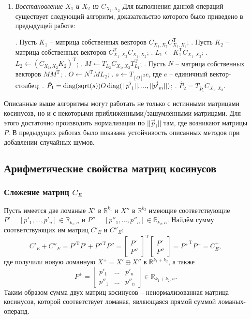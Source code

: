 \begin{enumerate}
\item \textit{Восстановление $X_1$ и $X_2$ из $C_{X_1, X_2}$}
Для выполнения данной операций существует следующий алгоритм, доказательство которого было приведено в предыдущей работе:
\begin{algorithmic}
.  Пусть $K_1$ -- матрица собственных векторов $C_{X_1,X_2}C^\mathrm{T}_{X_1,X_2}$;
.  Пусть ${K_2}$ -- матрица собственных векторов $C^\mathrm{T}_{X_1,X_2}C_{X_1,X_2}$;
.  $L_1 \gets K^\mathrm{T}_1C_{X_1,X_2}$;
.  $L_2 \gets (C_{X_1,X_2}K_2)^\mathrm{T}$;
.  $M \gets T_{L_2}C_{X_1,X_2}T^\mathrm{T}_{L_1}$;
.  Пусть $N$ -- матрица собственных векторов $MM^\mathrm{T}$;
.  $O \gets N^\mathrm{T}ML_2$;
.  $s \gets T_{[O]^2}e$, где $e$ -- единичный вектор-столбец;
.  $\hat{P}_1 = \operatorname{diag}(\operatorname{sqrt}(s))O\operatorname{diag}(||\vec{p'}_1||, ..., ||\vec{p'}_m||)$;
. $\hat{P}_2 = T_{\hat{P}_1}C_{X_1,X_2}$.
\end{algorithmic}
\end{enumerate}

Описанные выше алгоритмы могут работать не только с истинными матрицами косинусов, но и с некоторыми приближёнными/зашумлёнными матрицами. Для этого достаточно производить нормализации по $||\vec{p}_i||$ там, где возникают матрицы $P$. В предыдущих работах было показана устойчивость описанных методов при добавлении случайных шумов.
 
\subsection{Арифметические свойства матриц косинусов}
\subsubsection{Сложение матриц $C_E$}
Пусть имеется две ломаные $X'$ в $\mathbb{R}^{k_1}$ и $X''$ в $\mathbb{R}^{k_2}$ имеющие соответствующие $P' = [p'_1, ..., p'_n] \in \mathbb{R}_{k_1,n}$ и $P'' = [p''_1, ..., p''_n] \in \mathbb{R}_{k_2, n}$.
Найдём сумму соответствующих им матриц $C'_E$ и $C''_E$:
\begin{equation}
	C'_E + C''_E = {P'}^\mathrm{T}P' + {P''}^\mathrm{T}P'' = {\begin{bmatrix} P' \\ P'' \end{bmatrix}}^\mathrm{T}{\begin{bmatrix} P' \\ P'' \end{bmatrix}} = {P^{+}}^\mathrm{T}P^{+} = C_E^{+},
	\label{C_E_sum}
\end{equation}
где получили новую ломанную $X^{+} = X' \oplus X''$ в $\mathbb{R}^{k_1 + k_2}$, а также \begin{equation}P^{+} = \begin{bmatrix} p'_1 & ... & p'_n \\ p''_1 & ... & p''_n \end{bmatrix} \in \mathbb{R}_{k_1 + k_2, n}.\end{equation}
Таким образом сумма двух матриц косинусов -- ненормализованная матрица косинусов, которой соответствует ломаная, являющаяся прямой суммой ломаных-операнд.

